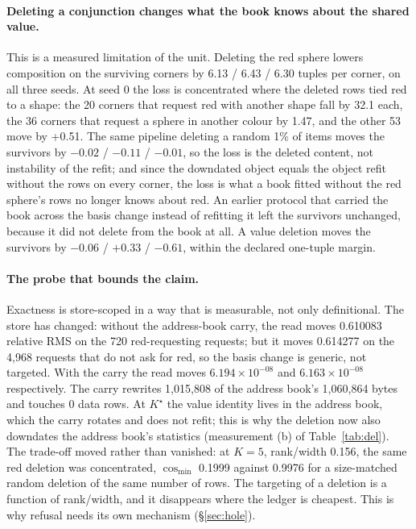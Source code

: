\documentclass{article} %
\newcommand{\sci}[2]{\ensuremath{#1\times10^{#2}}}
\newcommand{\Kstar}{\ensuremath{K^{\star}}}
\begin{document}
\paragraph{Deleting a conjunction changes what the book knows about the shared value.} This is a
measured limitation of the unit. Deleting the red sphere lowers composition on the surviving corners
by 6.13 / 6.43 / 6.30 tuples per corner, on all three seeds. At seed 0 the loss is concentrated where %
the deleted rows tied red to a shape: the 20 corners that request red with another shape fall by %
32.1 each, the 36 corners that request a sphere in another colour by 1.47, and the other 53 move %
by +0.51. The same pipeline deleting a random 1\% of items moves the survivors by $-0.02$ / %
$-0.11$ / $-0.01$, so the loss is the deleted content, not instability of the refit; and since the %
downdated object equals the object refit without the rows on every corner, the loss is what a book
fitted without the red sphere's rows no longer knows about red. An earlier protocol that carried the
book across the basis change instead of refitting it left the survivors unchanged, because it did
not delete from the book at all. A value deletion moves the survivors by $-0.06$ / $+0.33$ / %
$-0.61$, within the declared one-tuple margin. %

\paragraph{The probe that bounds the claim.} Exactness is store-scoped in a way that is
measurable, not only definitional.
The store has changed: without the address-book carry, the read moves 0.610083 relative RMS on
the 720 red-requesting requests; but it moves 0.614277 on the 4,968 requests that do not ask
for red, so the basis change is generic, not targeted. With the carry the read moves
\sci{6.194}{-08} and \sci{6.163}{-08} respectively. The carry rewrites 1,015,808 of the
address book's 1,060,864 bytes and touches 0 data rows. %
At $\Kstar$ the value identity
lives in the address book, which the carry rotates and does not refit; this is why the deletion
now also downdates the address book's statistics (measurement (b) of Table~\ref{tab:del}). The trade-off moved
rather than vanished: at $K=5$, rank/width 0.156, the same red deletion was concentrated,
$\cos_{\min}$ 0.1999 against 0.9976 for a size-matched random deletion of the same number of
rows. %
The targeting of a deletion is a function of rank/width, and it disappears where the ledger is
cheapest. This is why refusal needs its own mechanism (\S\ref{sec:hole}).
\end{document}
